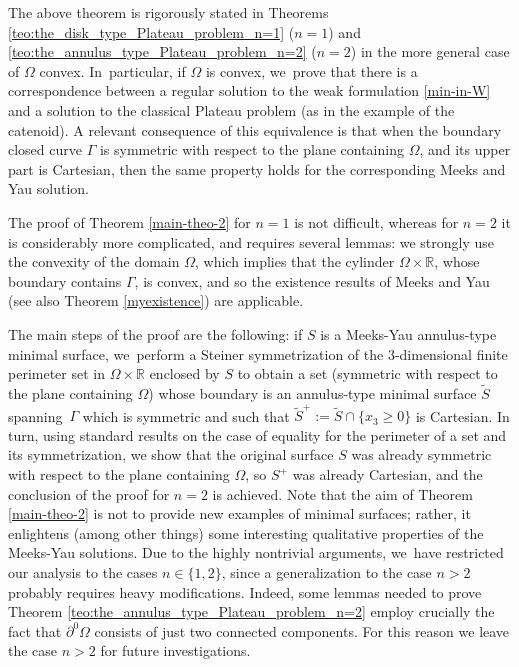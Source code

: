 \documentclass[11pt]{article}
\numberwithin{equation}{section}
\newcommand{\R}{\mathbb{R}}
\let\Om\Omega
\theoremstyle{definition}
\begin{document}
The above theorem is rigorously stated in Theorems \ref{teo:the_disk_type_Plateau_problem_n=1} ($n=1$) and \ref{teo:the_annulus_type_Plateau_problem_n=2} ($n=2$) in the more general case of $\Om$ convex. In~particular, if $\Om$ is convex, we~prove that there is a correspondence between a regular solution to the weak formulation \eqref{min-in-W} and a solution to the classical Plateau problem (as in the example of the catenoid).
A relevant consequence of this equivalence is
that when the boundary closed curve $\Gamma$ is symmetric with respect to the plane containing $\Om$, and its
upper part
is Cartesian, then the same property holds for the corresponding
Meeks and Yau solution.

The proof of Theorem \ref{main-theo-2} for $n=1$ is not difficult,
whereas for $n=2$ it is considerably more complicated,
and requires several lemmas:
we strongly use the convexity of the domain $\Omega$,
which implies that the cylinder $\Omega\times \R$, whose boundary contains $\Gamma$, is convex, and so the existence results of Meeks and Yau \cite{MY} (see also Theorem \ref{myexistence}) are applicable.

The main steps of the proof are the following: if $S$ is a Meeks-Yau annulus-type minimal surface, we~perform a Steiner symmetrization of the $3$-dimensional finite perimeter set in $\Omega\times\R$ enclosed by $S$ to obtain a set (symmetric with respect to the plane containing $\Om$) whose boundary is an annulus-type minimal surface $\widetilde S$ spanning~$\Gamma$ which is symmetric and such that $\widetilde S^+:=\widetilde S\cap\{x_3\ge0\}$ is Cartesian.
In turn, using standard results on the case
of equality for the perimeter of a set and its symmetrization, we
show that the original surface $S$
was already symmetric with respect to the plane containing $\Omega$, so $S^+$ was already Cartesian, and the conclusion of the proof for $n=2$ is achieved. Note that the aim of Theorem \ref{main-theo-2}
is not to provide new examples of minimal surfaces; rather, it enlightens
(among other things) some interesting qualitative properties of the Meeks-Yau
solutions.
Due to the highly nontrivial arguments, we~have restricted our analysis to the cases $n\in\{1,2\}$, since a generalization to the case $n>2$ probably requires heavy modifications.
Indeed, some lemmas needed to prove Theorem \ref{teo:the_annulus_type_Plateau_problem_n=2} employ crucially the fact that $\partial^0\Om$ consists of just two connected components.
For this reason we leave the case $n>2$ for future investigations.
\end{document}
